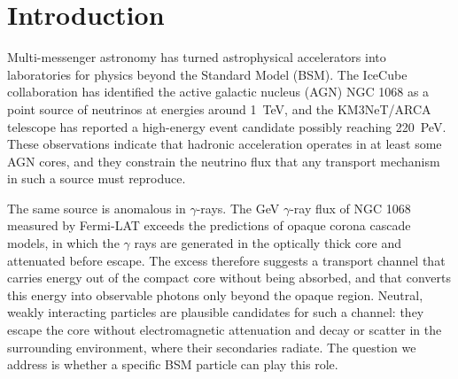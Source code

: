 \documentclass{ws-ijmpa}
\begin{document}


\section{Introduction}\label{sec:intro}

Multi-messenger astronomy has turned astrophysical accelerators into
laboratories for physics beyond the Standard Model (BSM). The IceCube
collaboration has identified the active galactic nucleus (AGN) NGC 1068 as a
point source of neutrinos at energies around \qty{1}{TeV},\cite{icecube2022evidence} and the KM3NeT/ARCA telescope has reported a
high-energy event candidate possibly reaching \qty{220}{PeV}.\cite{km3net2025observation} These observations indicate that hadronic
acceleration operates in at least some AGN cores, and they constrain the neutrino
flux that any transport mechanism in such a source must reproduce.

The same source is anomalous in $\gamma$-rays. The GeV $\gamma$-ray flux of
NGC 1068 measured by Fermi-LAT exceeds the predictions of opaque corona
cascade models, in which the $\gamma$ rays are generated in the optically
thick core and attenuated before escape.\cite{Ackermann_2015,murase2020hidden}
The excess therefore suggests a transport channel that
carries energy out of the compact core without being absorbed, and that
converts this energy into observable photons only beyond the opaque region.
Neutral, weakly interacting particles are plausible candidates for such a
channel: they escape the core without electromagnetic attenuation and
decay or scatter in the surrounding environment, where their secondaries 
radiate. The question we address is
whether a specific BSM particle can play this role.
\end{document}
